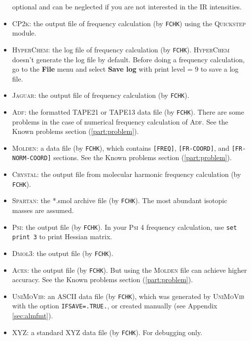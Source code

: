 \documentclass[12pt,english]{extarticle}
\begin{document}
\begin{itemize}
optional and can be neglected if you are not interested in the IR
intensities.
\item \textsc{CP2k}: the output file of frequency calculation (by \verb|FCHK|) using the
\textsc{Quickstep} module.
\item \textsc{HyperChem}: the log file of frequency calculation (by \verb|FCHK|).
\textsc{HyperChem} doesn't generate the log file by default. Before doing a frequency
calculation, go to the \textbf{File} menu and select \textbf{Save log} with print level = 9 to save a
log file.
\item \textsc{Jaguar}: the output file of frequency calculation (by \verb|FCHK|).
\item \textsc{Adf}: the formatted TAPE21 or TAPE13 data file (by \verb|FCHK|). There are
some problems in the case of numerical frequency calculation of \textsc{Adf}. See the
Known problems section (\ref{part:problem}).
\item \textsc{Molden}: a data file (by \verb|FCHK|), which contains \verb|[FREQ]|,
\verb|[FR-COORD]|, and \verb|[FR-NORM-COORD]| sections.
See the Known problems section (\ref{part:problem}).
\item \textsc{Crystal}: the output file from molecular harmonic frequency calculation (by \verb|FCHK|).
\item \textsc{Spartan}: the *.smol archive file (by \verb|FCHK|). The most abundant isotopic masses are assumed.
\item \textsc{Psi}: the output file (by \verb|FCHK|). In your \textsc{Psi} 4 frequency calculation, use \texttt{set print 3} to
print Hessian matrix.
\item \textsc{Dmol3}: the output file (by \verb|FCHK|).
\item \textsc{Aces}: the output file (by \verb|FCHK|). But using the \textsc{Molden} file can achieve higher accuracy. See the Known problems section (\ref{part:problem}).
\item \textsc{UniMoVib}: an ASCII data file (by \verb|FCHK|), which was generated by \textsc{UniMoVib} with the option \verb|IFSAVE=.TRUE.|, or created manually (see Appendix \ref{sec:almfmt}).
\item XYZ: a standard XYZ data file (by \verb|FCHK|). For debugging only.
\end{itemize}
\end{document}
